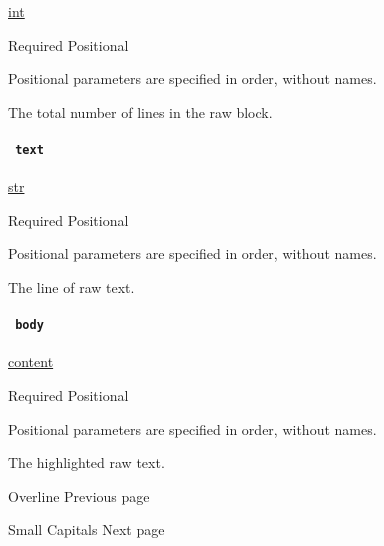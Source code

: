 \href{/docs/reference/foundations/int/}{int}

{Required} {{ Positional }}

\label{definitions-line-count-positional-tooltip}
Positional parameters are specified in order, without names.

The total number of lines in the raw block.

\paragraph{\texorpdfstring{\texttt{\ text\ }}{ text }}\label{definitions-line-text}

\href{/docs/reference/foundations/str/}{str}

{Required} {{ Positional }}

\label{definitions-line-text-positional-tooltip}
Positional parameters are specified in order, without names.

The line of raw text.

\paragraph{\texorpdfstring{\texttt{\ body\ }}{ body }}\label{definitions-line-body}

\href{/docs/reference/foundations/content/}{content}

{Required} {{ Positional }}

\label{definitions-line-body-positional-tooltip}
Positional parameters are specified in order, without names.

The highlighted raw text.

\href{/docs/reference/text/overline/}{\pandocbounded{}}

{ Overline } { Previous page }

\href{/docs/reference/text/smallcaps/}{\pandocbounded{}}

{ Small Capitals } { Next page }
